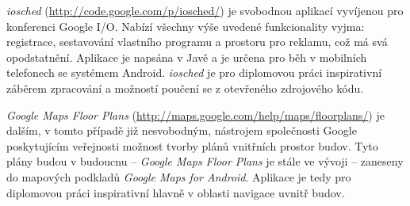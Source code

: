 \emph{iosched} (\url{http://code.google.com/p/iosched/}) je svobodnou aplikací vyvíjenou pro konferenci Google I/O. Nabízí všechny výše uvedené funkcionality vyjma: registrace, sestavování vlastního programu a prostoru pro reklamu, což má svá opodstatnění. Aplikace je napsána v Javě a je určena pro běh v mobilních telefonech se systémem Android. \emph{iosched} je pro diplomovou práci inspirativní záběrem zpracování a možností poučení se z otevřeného zdrojového kódu.

\textit{Google Maps Floor Plans} (\url{http://maps.google.com/help/maps/floorplans/}) je dalším, v tomto případě již nesvobodným, nástrojem společnosti Google poskytujícím veřejnosti možnost tvorby plánů vnitřních prostor budov. Tyto plány budou v budoucnu -- \emph{Google Maps Floor Plans} je stále ve vývoji -- zaneseny do mapových podkladů \emph{Google Maps for Android}. Aplikace je tedy pro diplomovou práci inspirativní hlavně v oblasti navigace uvnitř budov.
